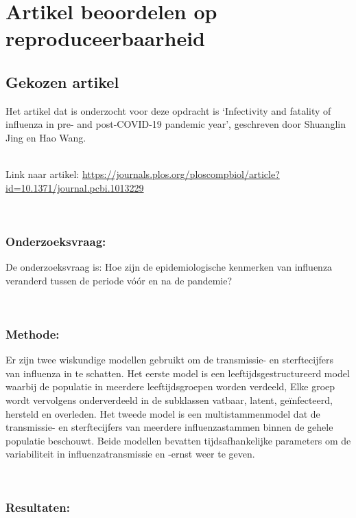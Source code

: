 \documentclass[
]{book}
\begin{document}
\chapter{Artikel beoordelen op reproduceerbaarheid}\label{artikel-beoordelen-op-reproduceerbaarheid}

\section{Gekozen artikel}\label{gekozen-artikel}

Het artikel dat is onderzocht voor deze opdracht is `Infectivity and fatality of influenza in pre- and post-COVID-19 pandemic year', geschreven door Shuanglin Jing en Hao Wang.\\
\strut \\
Link naar artikel:
\url{https://journals.plos.org/ploscompbiol/article?id=10.1371/journal.pcbi.1013229}\\
\strut \\

\subsection{Onderzoeksvraag:}\label{onderzoeksvraag}

De onderzoeksvraag is: Hoe zijn de epidemiologische kenmerken van influenza veranderd tussen de periode vóór en na de pandemie?\\
\strut \\

\subsection{Methode:}\label{methode}

Er zijn twee wiskundige modellen gebruikt om de transmissie- en sterftecijfers van influenza in te schatten. Het eerste model is een leeftijdsgestructureerd model waarbij de populatie in meerdere leeftijdsgroepen worden verdeeld, Elke groep wordt vervolgens onderverdeeld in de subklassen vatbaar, latent, geïnfecteerd, hersteld en overleden. Het tweede model is een multistammenmodel dat de transmissie- en sterftecijfers van meerdere influenzastammen binnen de gehele populatie beschouwt. Beide modellen bevatten tijdsafhankelijke parameters om de variabiliteit in influenzatransmissie en -ernst weer te geven.\\
\strut \\

\subsection{Resultaten:}\label{resultaten}
\end{document}
